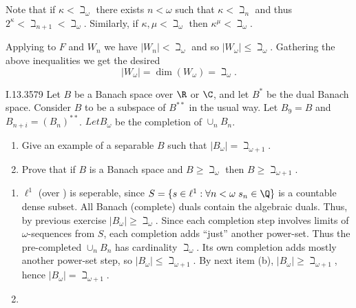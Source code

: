 Note that if \(\kappa < \beth_\omega\) there exists \(n < \omega\)
such that \(\kappa < \beth_n\) and thus \(2^\kappa < \beth_{n+1} < \beth_\omega\).
Similarly, if \(\kappa, \mu < \beth_\omega\) then \(\kappa^\mu < \beth_\omega\).

Applying to $F$ and \(W_n\) we have \(|W_n| < \beth_\omega\)
and so \(|W_\omega| \leq \beth_\omega\).
Gathering the above inequalities we get the desired
\begin{equation*}
|W_\omega| = \dim(W_\omega) = \beth_\omega.
\end{equation*}

\begin{lexcopy}{I.13.35}{79}
Let $B$ be a Banach space over \(\R\) or \(\C\), and let \(B^*\) be the
dual Banach space. Consider $B$ to be a subspace of \(B^{**}\) in the usual way.
Let
\(B_9 = B\) and \(B_{n+i} = (B_n)^{**}\). \(Let B_\omega\) be the completion
of \(\cup_n B_n\).
\begin{enumerate}
\renewcommand{\theenumi}{\alph{enumi}}
\item
Give an example of a separable $B$ such that \(|B_\omega|= \beth_{\omega + 1}\).
\item
Prove that if $B$ is a Banach space and \(B \geq \beth_\omega\) then
\(B \geq \beth_{\omega + 1}\).
\end{enumerate}
\end{lexcopy}

\begin{enumerate}
\renewcommand{\theenumi}{\alph{enumi}}
\item
\(\ell^1\) (over \R) is seperable, since
\(S = \{s\in \ell^1: \forall n<\omega\; s_n \in\Q\}\)
is a countable dense subset.
All Banach (complete) duals contain the algebraic duals.
Thus, by previous exercise \(|B_\omega| \geq \beth_\omega\).
Since each completion step involves limits of \(\omega\)-sequences from
$S$, each completion adds ``just'' another power-set.
Thus the pre-completed \(\cup_n B_n\) has cardinality \(\beth_\omega\).
Its own completion adds mostly another power-set step,
so \(|B_\omega| \leq \beth_{\omega+1}\).
By next item (b), \(|B_\omega| \geq \beth_{\omega+1}\),
hence \(|B_\omega| = \beth_{\omega+1}\).
\item
\unfinished
\end{enumerate}

